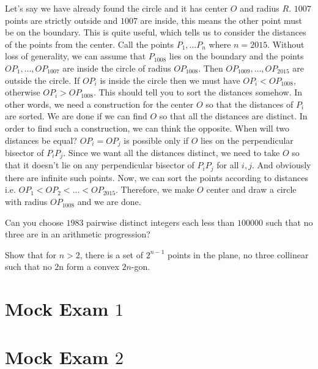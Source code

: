 \documentclass{subfile}
\begin{document}
		\begin{solution}
			Let's say we have already found the circle and it has center $O$ and radius $R$. $1007$ points are strictly outside and $1007$ are inside, this means the other point must be on the boundary. This is quite useful, which tells us to consider the distances of the points from the center. Call the points $P_1,...P_{n}$ where $n=2015$. Without loss of generality, we can assume that $P_1008$ lies on the boundary and the points $OP_1,...,OP_{1007}$ are inside the circle of radius $OP_{1008}$. Then $OP_{1009},...,OP_{2015}$ are outside the circle. If $OP_i$ is inside the circle then we must have $OP_i<OP_{1008}$, otherwise $OP_i>OP_{1008}$. This should tell you to sort the distances somehow. In other words, we need a construction for the center $O$ so that the distances of $P_i$ are sorted. We are done if we can find $O$ so that all the distances are distinct. In order to find such a construction, we can think the opposite. When will two distances be equal? $OP_i=OP_j$ is possible only if $O$ lies on the perpendicular bisector of $P_iP_j$. Since we want all the distances distinct, we need to take $O$ so that it doesn't lie on any perpendicular bisector of $P_iP_j$ for all $i,j$. And obviously there are infinite such points. Now, we can sort the points according to distances i.e. $OP_1<OP_2<...<OP_{2015}$. Therefore, we make $O$ center and draw a circle with radius $OP_{1008}$ and we are done.
		\end{solution}
		
		\begin{problem}
			Can you choose $1983$ pairwise distinct integers each less than $100000$ such that no three are in an arithmetic progression?
		\end{problem}
		
		\begin{problem}
			Show that for $n>2$, there is a set of $2^{n-1}$ points in the plane, no three collinear such that no $2$n form a convex $2n$-gon.
		\end{problem}
		
		\newpage
		
		\section{Mock Exam $1$}
		
		\newpage
		
		\section{Mock Exam $2$}
		
\end{document}
